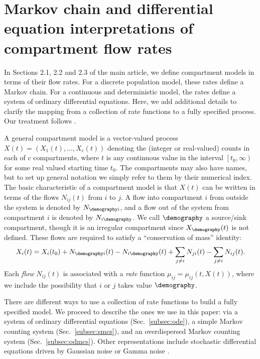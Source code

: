 \section{Markov chain and differential equation interpretations of compartment flow rates}

In Sections 2.1, 2.2 and 2.3 of the main article, we define compartment models in terms of their flow rates.
For a discrete population model, these rates define a Markov chain.
For a continuous and deterministic model, the rates define a system of ordinary differential equations.
Here, we add additional details to clarify the mapping from a collection of rate functions to a fully specified process.
Our treatment follows \citet{breto09}.

A general compartment model is a vector-valued process $X(t)=(X_1(t),\dots,X_c(t))$ denoting the (integer or real-valued) counts in each of $c$ compartments, where $t$ is any continuous value in the interval  $\left[t_0, \infty\right)$ for some real valued starting time $t_0$.
The compartments may also have names, but to set up general notation we simply refer to them by their numerical index.
The basic characteristic of a compartment model is that $X(t)$ can be written in terms of the flows $N_{ij}(t)$ from $i$ to $j$.
A flow into compartment $i$ from outside the system is denoted by $N_{\demography i}$, and a flow out of the system from compartment $i$ is denoted by $N_{i\demography}$.
We call $\demography$ a source/sink compartment, though it is an irregular compartment since $X_{\demography}(t)$ is not defined.
These flows are required to satisfy a ``conservation of mass'' identity:
\begin{equation}
X_i(t)=X_i(t_0)+N_{\demography i}(t) - N_{i\demography}(t) + \sum_{j\neq
i}N_{ji}(t)-\sum_{j\neq i}N_{ij}(t). \label{eq:conservation}
\end{equation}
Each {\em flow} $N_{ij}(t)$ is associated with a {\em rate} function
$\mu_{ij}=\mu_{ij}(t,X(t))$, where we include the possibility that $i$ or $j$ takes value $\demography$.

There are different ways to use a collection of rate functions to build a fully specified model.
We proceed to describe the ones we use in this paper: via a system of ordinary differential equations (Sec.~\ref{subsec:ode}), a simple Markov counting system (Sec.~\ref{subsec:smcs}), and an overdispersed Markov counting system (Sec.~\ref{subsec:odmcs}). Other representations include stochastic differential equations driven by Gaussian noise or Gamma noise \citep{bhadra11}.

